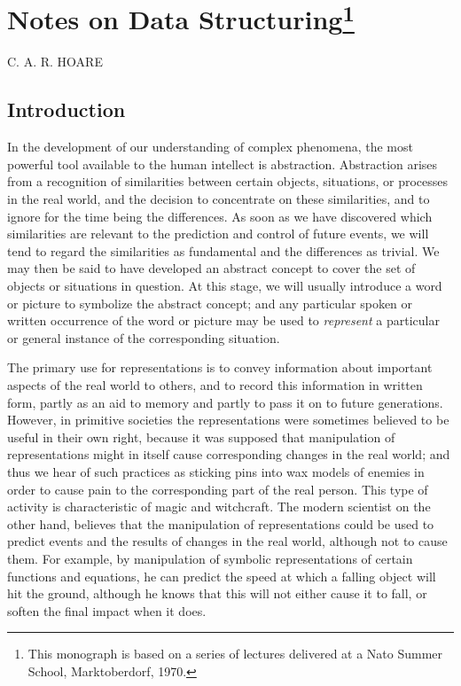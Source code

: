 \chapter[Notes on Data Structuring]{Notes on Data Structuring\footnote{This monograph is based on a series of lectures delivered at a Nato Summer School, Marktoberdorf, 1970.}}

{
	\noindent
	\scshape\hfill\scriptsize C. A. R. HOARE\hfill
}
\renewcommand{\leftmark}{\normalfont\scriptsize\hfill C. A. R. HOARE\hfill}

\section{Introduction}

In the development of our understanding of complex phenomena, the most powerful tool available to the human intellect is abstraction. Abstraction arises from a recognition of similarities between certain objects, situations, or processes in the real world, and the decision to concentrate on these similarities, and to ignore for the time being the differences. As soon as we have discovered which similarities are relevant to the prediction and control of future events, we will tend to regard the similarities as fundamental and the differences as trivial. We may then be said to have developed an abstract concept to cover the set of objects or situations in question. At this stage, we will usually introduce a word or picture to symbolize the abstract concept; and any particular spoken or written occurrence of the word or picture may be used to \textit{represent} a particular or general instance of the corresponding situation.

The primary use for representations is to convey information about important aspects of the real world to others, and to record this information in written form, partly as an aid to memory and partly to pass it on to future generations. However, in primitive societies the representations were sometimes believed to be useful in their own right, because it was supposed that manipulation of representations might in itself cause corresponding changes in the real world; and thus we hear of such practices as sticking pins into wax models of enemies in order to cause pain to the corresponding part of the real person. This type of activity is characteristic of magic and witchcraft. The modern scientist on the other hand, believes that the manipulation of representations could be used to predict events and the results of changes in the real world, although not to cause them. For example, by manipulation of symbolic representations of certain functions and equations, he can predict the speed at which a falling object will hit the ground, although he knows that this will not either cause it to fall, or soften the final impact when it does.

